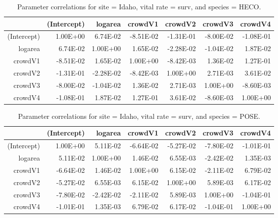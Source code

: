 \documentclass[12pt,]{article}
\begin{document}
\begin{table}[ht]
\centering
\caption{Parameter correlations for site = Idaho, vital rate = surv, and species = HECO.} 
\begin{tabular}{rrrrrrr}
  \hline
 & (Intercept) & logarea & crowdV1 & crowdV2 & crowdV3 & crowdV4 \\ 
  \hline
(Intercept) & 1.00E+00 & 6.74E-02 & -8.51E-02 & -1.31E-01 & -8.00E-02 & -1.08E-01 \\ 
  logarea & 6.74E-02 & 1.00E+00 & 1.65E-02 & -2.28E-02 & -1.04E-02 & 1.87E-02 \\ 
  crowdV1 & -8.51E-02 & 1.65E-02 & 1.00E+00 & -8.42E-03 & 1.36E-02 & 1.27E-01 \\ 
  crowdV2 & -1.31E-01 & -2.28E-02 & -8.42E-03 & 1.00E+00 & 2.71E-03 & 3.61E-02 \\ 
  crowdV3 & -8.00E-02 & -1.04E-02 & 1.36E-02 & 2.71E-03 & 1.00E+00 & -8.60E-03 \\ 
  crowdV4 & -1.08E-01 & 1.87E-02 & 1.27E-01 & 3.61E-02 & -8.60E-03 & 1.00E+00 \\ 
   \hline
\end{tabular}
\end{table}

\begin{table}[ht]
\centering
\caption{Parameter correlations for site = Idaho, vital rate = surv, and species = POSE.} 
\begin{tabular}{rrrrrrr}
  \hline
 & (Intercept) & logarea & crowdV1 & crowdV2 & crowdV3 & crowdV4 \\ 
  \hline
(Intercept) & 1.00E+00 & 5.11E-02 & -6.64E-02 & -5.27E-02 & -7.80E-02 & -1.01E-01 \\ 
  logarea & 5.11E-02 & 1.00E+00 & 1.46E-02 & 6.55E-03 & -2.42E-02 & 1.35E-03 \\ 
  crowdV1 & -6.64E-02 & 1.46E-02 & 1.00E+00 & 6.15E-02 & -2.11E-02 & 6.79E-02 \\ 
  crowdV2 & -5.27E-02 & 6.55E-03 & 6.15E-02 & 1.00E+00 & 5.89E-03 & 6.17E-02 \\ 
  crowdV3 & -7.80E-02 & -2.42E-02 & -2.11E-02 & 5.89E-03 & 1.00E+00 & -1.04E-01 \\ 
  crowdV4 & -1.01E-01 & 1.35E-03 & 6.79E-02 & 6.17E-02 & -1.04E-01 & 1.00E+00 \\ 
   \hline
\end{tabular}
\end{table}
\end{document}
